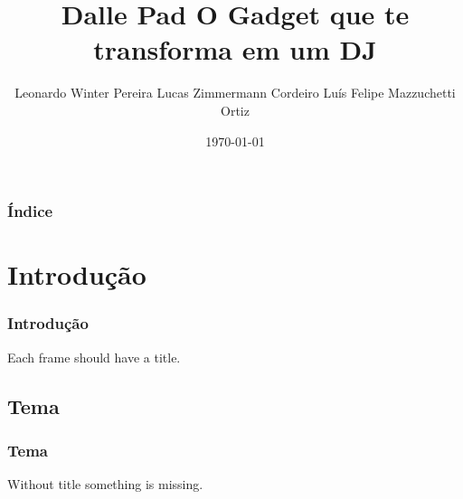 \documentclass[hyperref={pdfpagelabels=false}]{beamer}
\title{Dalle Pad \newline O Gadget que te transforma em um DJ}
\author{Leonardo Winter Pereira \newline Lucas Zimmermann Cordeiro \newline Luís Felipe Mazzuchetti Ortiz}
\date{\today}
\begin{document}
    \begin{frame}
    \titlepage
    \end{frame}

    \begin{frame}\frametitle{Índice}\tableofcontents
    \end{frame}

        \section{Introdução}

        \begin{frame}\frametitle{Introdução}
        Each frame should have a title.
        \end{frame}

            \subsection{Tema}

            \begin{frame}\frametitle{Tema}
            Without title something is missing.
            \end{frame}
\end{document}
